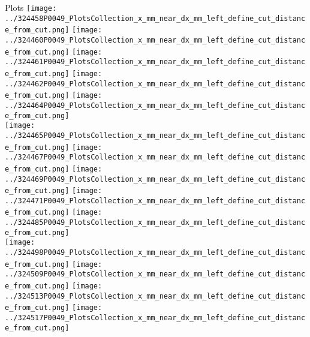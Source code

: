 \documentclass{beamer}
\begin{document}
\begin{frame}\tiny
        \begin{block}{Plots}
		  \centering
                \texttt{[image: ../324458P0049\_PlotsCollection\_x\_mm\_near\_dx\_mm\_left\_define\_cut\_distance\_from\_cut.png]}
                \texttt{[image: ../324460P0049\_PlotsCollection\_x\_mm\_near\_dx\_mm\_left\_define\_cut\_distance\_from\_cut.png]}
                \texttt{[image: ../324461P0049\_PlotsCollection\_x\_mm\_near\_dx\_mm\_left\_define\_cut\_distance\_from\_cut.png]}
                \texttt{[image: ../324462P0049\_PlotsCollection\_x\_mm\_near\_dx\_mm\_left\_define\_cut\_distance\_from\_cut.png]}
                \texttt{[image: ../324464P0049\_PlotsCollection\_x\_mm\_near\_dx\_mm\_left\_define\_cut\_distance\_from\_cut.png]}\\
                \texttt{[image: ../324465P0049\_PlotsCollection\_x\_mm\_near\_dx\_mm\_left\_define\_cut\_distance\_from\_cut.png]}
                \texttt{[image: ../324467P0049\_PlotsCollection\_x\_mm\_near\_dx\_mm\_left\_define\_cut\_distance\_from\_cut.png]}
                \texttt{[image: ../324469P0049\_PlotsCollection\_x\_mm\_near\_dx\_mm\_left\_define\_cut\_distance\_from\_cut.png]}
                \texttt{[image: ../324471P0049\_PlotsCollection\_x\_mm\_near\_dx\_mm\_left\_define\_cut\_distance\_from\_cut.png]}
                \texttt{[image: ../324485P0049\_PlotsCollection\_x\_mm\_near\_dx\_mm\_left\_define\_cut\_distance\_from\_cut.png]}\\
                \texttt{[image: ../324498P0049\_PlotsCollection\_x\_mm\_near\_dx\_mm\_left\_define\_cut\_distance\_from\_cut.png]}
                \texttt{[image: ../324509P0049\_PlotsCollection\_x\_mm\_near\_dx\_mm\_left\_define\_cut\_distance\_from\_cut.png]}
                \texttt{[image: ../324513P0049\_PlotsCollection\_x\_mm\_near\_dx\_mm\_left\_define\_cut\_distance\_from\_cut.png]}
                \texttt{[image: ../324517P0049\_PlotsCollection\_x\_mm\_near\_dx\_mm\_left\_define\_cut\_distance\_from\_cut.png]}

\end{block}
\end{frame}
\end{document}
